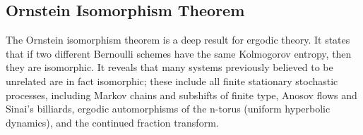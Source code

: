 \documentclass{article}
\begin{document}
\subsection{Ornstein Isomorphism Theorem}
The Ornstein isomorphism theorem is a deep result for ergodic theory. It states that if two different Bernoulli schemes have the same Kolmogorov entropy, then they are isomorphic. It reveals that many systems previously believed to be unrelated are in fact isomorphic; these include all finite stationary stochastic processes, including Markov chains and subshifts of finite type, Anosov flows and Sinai's billiards, ergodic automorphisms of the n-torus (uniform hyperbolic dynamics), and the continued fraction transform.




\end{document}

